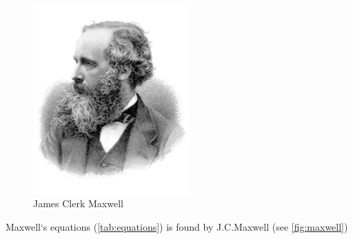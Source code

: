 \documentclass{article}
\begin{document}
\begin{figure}[H]
	\centering
	\includegraphics[width=6cm]{James_Clerk_Maxwell.png}
	\caption{James Clerk Maxwell}
	\label{fig:maxwell}
\end{figure}
Maxwell`s equations (\autoref{tab:equations}) is found by J.C.Maxwell (see \autoref{fig:maxwell})
\end{document}
